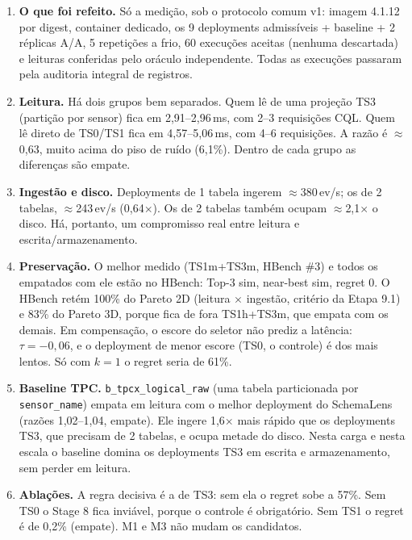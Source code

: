 \begin{enumerate}
\item \textbf{O que foi refeito.} Só a medição, sob o protocolo comum v1: imagem 4.1.12 por digest, container dedicado, os 9 deployments admissíveis + baseline + 2 réplicas A/A, 5 repetições a frio, 60 execuções aceitas (nenhuma descartada) e \envrawreads{} leituras conferidas pelo oráculo independente. Todas as execuções passaram pela auditoria integral de registros.
\item \textbf{Leitura.} Há dois grupos bem separados. Quem lê de uma projeção TS3 (partição por sensor) fica em 2,91--2,96\,ms, com 2--3 requisições CQL. Quem lê direto de TS0/TS1 fica em 4,57--5,06\,ms, com 4--6 requisições. A razão é $\approx$0,63, muito acima do piso de ruído (6,1\%). Dentro de cada grupo as diferenças são empate.
\item \textbf{Ingestão e disco.} Deployments de 1 tabela ingerem $\approx$380\,ev/s; os de 2 tabelas, $\approx$243\,ev/s (0,64$\times$). Os de 2 tabelas também ocupam $\approx$2,1$\times$ o disco. Há, portanto, um compromisso real entre leitura e escrita/armazenamento.
\item \textbf{Preservação.} O melhor medido (TS1m+TS3m, HBench \#3) e todos os empatados com ele estão no HBench: Top-3 sim, near-best sim, regret 0. O HBench retém 100\% do Pareto 2D (leitura $\times$ ingestão, critério da Etapa 9.1) e 83\% do Pareto 3D, porque fica de fora TS1h+TS3m, que empata com os demais. Em compensação, o escore do seletor não prediz a latência: $\tau=-0{,}06$, e o deployment de menor escore (TS0, o controle) é dos mais lentos. Só com $k=1$ o regret seria de 61\%.
\item \textbf{Baseline TPC.} \texttt{b\_tpcx\_logical\_raw} (uma tabela particionada por \texttt{sensor\_name}) empata em leitura com o melhor deployment do SchemaLens (razões 1,02--1,04, empate). Ele ingere 1,6$\times$ mais rápido que os deployments TS3, que precisam de 2 tabelas, e ocupa metade do disco. Nesta carga e nesta escala o baseline domina os deployments TS3 em escrita e armazenamento, sem perder em leitura.
\item \textbf{Ablações.} A regra decisiva é a de TS3: sem ela o regret sobe a 57\%. Sem TS0 o Stage 8 fica inviável, porque o controle é obrigatório. Sem TS1 o regret é de 0,2\% (empate). M1 e M3 não mudam os candidatos.
\end{enumerate}
